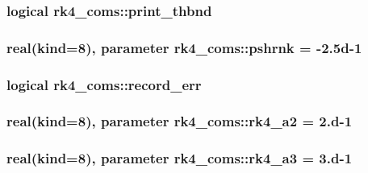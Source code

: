 \subsubsection[{print\+\_\+thbnd}]{\setlength{\rightskip}{0pt plus 5cm}logical rk4\+\_\+coms\+::print\+\_\+thbnd}\label{namespacerk4__coms_ad87029f758f9a6906b3aea2205873427}
\hypertarget{namespacerk4__coms_a83a7b5210aa05ed67147b0b6e4250f46}{}
\subsubsection[{pshrnk}]{\setlength{\rightskip}{0pt plus 5cm}real(kind=8), parameter rk4\+\_\+coms\+::pshrnk = -\/2.\+5d-\/1}\label{namespacerk4__coms_a83a7b5210aa05ed67147b0b6e4250f46}
\hypertarget{namespacerk4__coms_a8758ba5171a32f83e20dd93601fa21d6}{}
\subsubsection[{record\+\_\+err}]{\setlength{\rightskip}{0pt plus 5cm}logical rk4\+\_\+coms\+::record\+\_\+err}\label{namespacerk4__coms_a8758ba5171a32f83e20dd93601fa21d6}
\hypertarget{namespacerk4__coms_aaccaa3d4ec955eecd38ce2c8c8813cf9}{}
\subsubsection[{rk4\+\_\+a2}]{\setlength{\rightskip}{0pt plus 5cm}real(kind=8), parameter rk4\+\_\+coms\+::rk4\+\_\+a2 = 2.d-\/1}\label{namespacerk4__coms_aaccaa3d4ec955eecd38ce2c8c8813cf9}
\hypertarget{namespacerk4__coms_aaa2167ee06ad594c46793e7280b248f7}{}
\subsubsection[{rk4\+\_\+a3}]{\setlength{\rightskip}{0pt plus 5cm}real(kind=8), parameter rk4\+\_\+coms\+::rk4\+\_\+a3 = 3.d-\/1}\label{namespacerk4__coms_aaa2167ee06ad594c46793e7280b248f7}
\hypertarget{namespacerk4__coms_aaa712c298024351472a4f80d5020e7fc}{}
